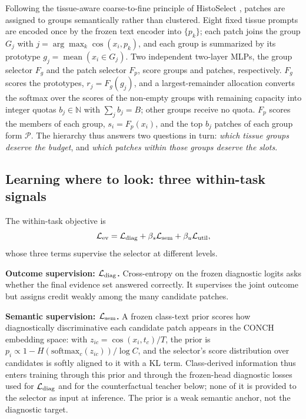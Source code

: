 \documentclass{article}
\def\L{{\cal L}}
\newcommand{\Fg}{F_g}
\newcommand{\Fp}{F_p}
\newcommand{\Psel}{\mathcal{P}}
\begin{document}
Following the tissue-aware coarse-to-fine principle of HistoSelect \cite{huang2026histoselect}, patches are assigned to groups semantically rather than clustered. Eight fixed tissue prompts are encoded once by the frozen text encoder into $\{p_k\}$; each patch joins the group $G_j$ with $j=\arg\max_k\cos(x_i,p_k)$, and each group is summarized by its prototype $g_j=\operatorname{mean}(x_i\in G_j)$. Two independent two-layer MLPs, the group selector $\Fg$ and the patch selector $\Fp$, score groups and patches, respectively. $\Fg$ scores the prototypes, $r_j=\Fg(g_j)$, and a largest-remainder allocation converts the softmax over the scores of the non-empty groups with remaining capacity into integer quotas $b_j\in\mathbb{N}$ with $\sum_j b_j=B$; other groups receive no quota. $\Fp$ scores the members of each group, $s_i=\Fp(x_i)$, and the top $b_j$ patches of each group form $\Psel$. The hierarchy thus answers two questions in turn: \emph{which tissue groups deserve the budget}, and \emph{which patches within those groups deserve the slots}.

\subsection{Learning where to look: three within-task signals}
\label{ssec:within}

The within-task objective is
\begin{equation}
\L_{\mathrm{ev}}
=
\L_{\mathrm{diag}}
+\beta_s\L_{\mathrm{sem}}
+\beta_u\L_{\mathrm{util}},
\end{equation}
whose three terms supervise the selector at different levels.

\textbf{Outcome supervision: $\L_{\mathrm{diag}}$.}
Cross-entropy on the frozen diagnostic logits asks whether the final evidence set answered correctly. It supervises the joint outcome but assigns credit weakly among the many candidate patches.

\textbf{Semantic supervision: $\L_{\mathrm{sem}}$.}
A frozen class-text prior scores how diagnostically discriminative each candidate patch appears in the CONCH embedding space: with $z_{ic}=\cos(x_i,t_c)/T$, the prior is $p_i\propto 1-H(\mathrm{softmax}_c(z_{ic}))/\log C$, and the selector's score distribution over candidates is softly aligned to it with a KL term. Class-derived information thus enters training through this prior and through the frozen-head diagnostic losses used for $\L_{\rm diag}$ and for the counterfactual teacher below; none of it is provided to the selector as input at inference. The prior is a weak semantic anchor, not the diagnostic target.
\end{document}

